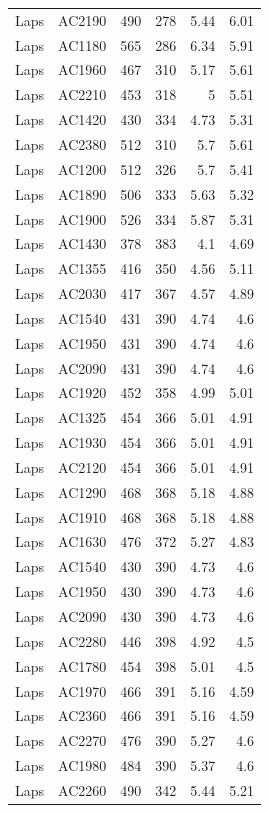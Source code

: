 \documentclass[article,10pt,microtype]{article}
\begin{document}
\begin{longtable}{llrrrr}
Laps & AC2190 & 490 & 278 & 5.44 & 6.01\\
Laps & AC1180 & 565 & 286 & 6.34 & 5.91\\
Laps & AC1960 & 467 & 310 & 5.17 & 5.61\\
Laps & AC2210 & 453 & 318 & 5 & 5.51\\
Laps & AC1420 & 430 & 334 & 4.73 & 5.31\\
Laps & AC2380 & 512 & 310 & 5.7 & 5.61\\
Laps & AC1200 & 512 & 326 & 5.7 & 5.41\\
Laps & AC1890 & 506 & 333 & 5.63 & 5.32\\
Laps & AC1900 & 526 & 334 & 5.87 & 5.31\\
Laps & AC1430 & 378 & 383 & 4.1 & 4.69\\
Laps & AC1355 & 416 & 350 & 4.56 & 5.11\\
Laps & AC2030 & 417 & 367 & 4.57 & 4.89\\
Laps & AC1540 & 431 & 390 & 4.74 & 4.6\\
Laps & AC1950 & 431 & 390 & 4.74 & 4.6\\
Laps & AC2090 & 431 & 390 & 4.74 & 4.6\\
Laps & AC1920 & 452 & 358 & 4.99 & 5.01\\
Laps & AC1325 & 454 & 366 & 5.01 & 4.91\\
Laps & AC1930 & 454 & 366 & 5.01 & 4.91\\
Laps & AC2120 & 454 & 366 & 5.01 & 4.91\\
Laps & AC1290 & 468 & 368 & 5.18 & 4.88\\
Laps & AC1910 & 468 & 368 & 5.18 & 4.88\\
Laps & AC1630 & 476 & 372 & 5.27 & 4.83\\
Laps & AC1540 & 430 & 390 & 4.73 & 4.6\\
Laps & AC1950 & 430 & 390 & 4.73 & 4.6\\
Laps & AC2090 & 430 & 390 & 4.73 & 4.6\\
Laps & AC2280 & 446 & 398 & 4.92 & 4.5\\
Laps & AC1780 & 454 & 398 & 5.01 & 4.5\\
Laps & AC1970 & 466 & 391 & 5.16 & 4.59\\
Laps & AC2360 & 466 & 391 & 5.16 & 4.59\\
Laps & AC2270 & 476 & 390 & 5.27 & 4.6\\
Laps & AC1980 & 484 & 390 & 5.37 & 4.6\\
Laps & AC2260 & 490 & 342 & 5.44 & 5.21\\

\end{longtable}
\end{document}
